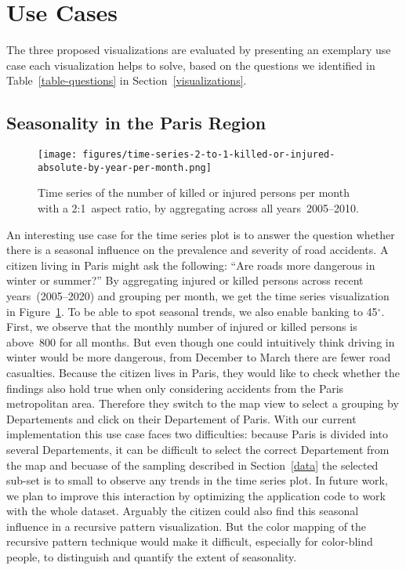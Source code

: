 \section{Use Cases}
The three proposed visualizations are evaluated by presenting an exemplary use case each visualization helps to solve, based on the questions we identified in Table~\ref{table-questions} in Section~\ref{visualizations}.

\subsection{Seasonality in the Paris Region}
\begin{figure}
    \centering
    \texttt{[image: figures/time-series-2-to-1-killed-or-injured-absolute-by-year-per-month.png]}
    \caption{Time series of the number of killed or injured persons per month with a 2:1~aspect ratio, by aggregating across all years~2005--2010.}
    \label{figure-time-series-killed-injured-by-year-per-month}
\end{figure}
An interesting use case for the time series plot is to answer the question whether there is a seasonal influence on the prevalence and severity of road accidents. A citizen living in Paris might ask the following: \enquote{Are roads more dangerous in winter or summer?}
By aggregating injured or killed persons across recent years~(2005--2020) and grouping per month, we get the time series visualization in Figure~\ref{figure-time-series-killed-injured-by-year-per-month}. To be able to spot seasonal trends, we also enable banking to 45\(^\circ\). First, we observe that the monthly number of injured or killed persons is above~800 for all months. But even though one could intuitively think driving in winter would be more dangerous, from December to March there are fewer road casualties.
Because the citizen lives in Paris, they would like to check whether the findings also hold true when only considering accidents from the Paris metropolitan area.
Therefore they switch to the map view to select a grouping by Departements and click on their Departement of Paris. 
With our current implementation this use case faces two difficulties: \Ni because Paris is divided into several Departements, it can be difficult to select the correct Departement from the map and \Nii becuase of the sampling described in Section~\ref{data} the selected sub-set is to small to observe any trends in the time series plot.
In future work, we plan to improve this interaction by optimizing the application code to work with the whole dataset.
Arguably the citizen could also find this seasonal influence in a recursive pattern visualization. But the color mapping of the recursive pattern technique would make it difficult, especially for color-blind people, to distinguish and quantify the extent of seasonality.

